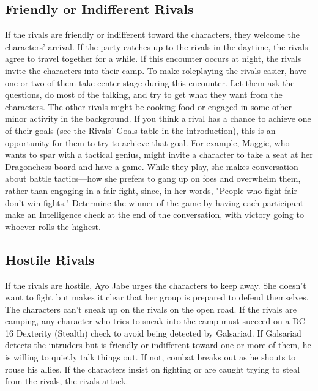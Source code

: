 \documentclass[10pt,a4,twoside,twocolumn,openany,nodeprecatedcode]{dndbook}
\begin{document}
\subsection{Friendly or Indifferent Rivals}
If the rivals are friendly or indifferent toward the characters, they welcome the characters' arrival. If the party catches up to the rivals in the daytime, the rivals agree to travel together for a while. If this encounter occurs at night, the rivals invite the characters into their camp.
To make roleplaying the rivals easier, have one or two of them take center stage during this encounter. Let them ask the questions, do most of the talking, and try to get what they want from the characters. The other rivals might be cooking food or engaged in some other minor activity in the background.
If you think a rival has a chance to achieve one of their goals (see the Rivals' Goals table in the introduction), this is an opportunity for them to try to achieve that goal. For example, Maggie, who wants to spar with a tactical genius, might invite a character to take a seat at her Dragonchess board and have a game. While they play, she makes conversation about battle tactics—how she prefers to gang up on foes and overwhelm them, rather than engaging in a fair fight, since, in her words, "People who fight fair don't win fights." Determine the winner of the game by having each participant make an Intelligence check at the end of the conversation, with victory going to whoever rolls the highest.
\subsection{Hostile Rivals}
If the rivals are hostile, Ayo Jabe urges the characters to keep away. She doesn't want to fight but makes it clear that her group is prepared to defend themselves.
The characters can't sneak up on the rivals on the open road. If the rivals are camping, any character who tries to sneak into the camp must succeed on a DC 16 Dexterity (Stealth) check to avoid being detected by Galsariad. If Galsariad detects the intruders but is friendly or indifferent toward one or more of them, he is willing to quietly talk things out. If not, combat breaks out as he shouts to rouse his allies.
If the characters insist on fighting or are caught trying to steal from the rivals, the rivals attack.
\end{document}
